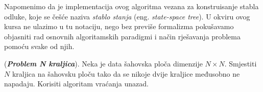     Napomenimo da je implementacija ovog algoritma vezana za konstruisanje stabla odluke, koje se češće naziva \textit{stablo stanja} (eng. \textit{state-space tree}). U okviru ovog kursa ne ulazimo u tu notaciju, nego bez previše formalizma pokušavamo objasniti rad osnovnih algoritamskih paradigmi i način rješavanja problema pomoću svake od njih.    
    
    
    \begin{example}
    	(\textbf{\emph{Problem N kraljica}}).  Neka je data šahovska ploča dimenzije $N\times N$. Smjestiti $N $ kraljica na šahovsku ploču tako da se nikoje dvije kraljice međusobno ne napadaju.  Korisiti algoritam vraćanja unazad. 
    \end{example}


